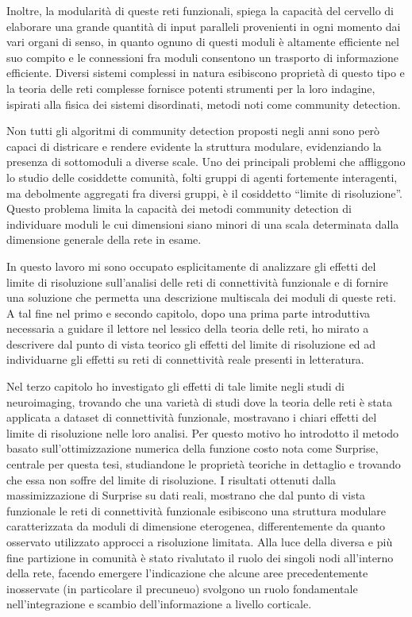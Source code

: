Inoltre, la modularità di queste reti funzionali, spiega la capacità del cervello di elaborare una grande quantità di input paralleli provenienti in ogni momento dai vari organi di senso, in quanto ognuno di questi moduli è altamente efficiente nel suo compito e le connessioni fra moduli consentono un trasporto di informazione efficiente.
Diversi sistemi complessi in natura esibiscono proprietà di questo tipo e la teoria delle reti complesse fornisce potenti strumenti per la loro indagine, ispirati alla fisica dei sistemi disordinati, metodi noti come community detection.

Non tutti gli algoritmi di community detection proposti negli anni sono però capaci di districare e rendere evidente la struttura modulare, evidenziando la presenza di sottomoduli a diverse scale.
Uno dei principali problemi che affliggono lo studio delle cosiddette comunità, folti gruppi di agenti fortemente interagenti, ma debolmente aggregati fra diversi gruppi, è il cosiddetto ``limite di risoluzione''.
Questo problema limita la capacità dei metodi community detection di individuare moduli le cui dimensioni siano minori di una scala determinata dalla dimensione generale della rete in esame.

In questo lavoro mi sono occupato esplicitamente di analizzare gli effetti del limite di risoluzione sull'analisi delle reti di connettività funzionale e di fornire una soluzione che permetta una descrizione multiscala dei moduli di queste reti.
A tal fine nel primo e secondo capitolo, dopo una prima parte introduttiva necessaria a guidare il lettore nel lessico della teoria delle reti, ho mirato a descrivere dal punto di vista teorico gli effetti del limite di risoluzione ed ad individuarne gli effetti su reti di connettività reale presenti in letteratura.

Nel terzo capitolo ho investigato gli effetti di tale limite negli studi di neuroimaging, trovando che una varietà di studi dove la teoria delle reti è stata applicata a dataset di connettività funzionale, mostravano i chiari effetti del limite di risoluzione nelle loro analisi.
Per questo motivo ho introdotto il metodo basato sull'ottimizzazione numerica della funzione costo nota come Surprise, centrale per questa tesi, studiandone le proprietà teoriche in dettaglio e trovando che essa non soffre del limite di risoluzione.
I risultati ottenuti dalla massimizzazione di Surprise su dati reali, mostrano che dal punto di vista funzionale le reti di connettività funzionale esibiscono una struttura modulare caratterizzata da moduli di dimensione eterogenea, differentemente da quanto osservato utilizzato approcci a risoluzione limitata.
Alla luce della diversa e più fine partizione in comunità è stato rivalutato il ruolo dei singoli nodi all'interno della rete, facendo emergere l'indicazione che alcune aree precedentemente inosservate (in particolare il precuneuo) svolgono un ruolo fondamentale nell'integrazione e scambio dell'informazione a livello corticale.

